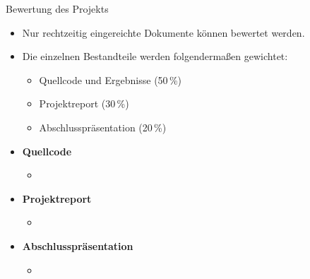 \begin{dwHeaderFrame}{Bewertung des Projekts}
	\begin{itemize}
		\item Nur rechtzeitig eingereichte Dokumente können bewertet werden.
		\item Die einzelnen Bestandteile werden folgendermaßen gewichtet:
		\begin{itemize}
			\item Quellcode und Ergebnisse (50\,\%)
			\item Projektreport (30\,\%)
			\item Abschlusspräsentation (20\,\%)
		\end{itemize}
	\end{itemize}

\end{dwHeaderFrame}


\begin{frame}
	\begin{itemize}
		\item \textbf{Quellcode}
		\begin{itemize}
			\item
		\end{itemize}
		\item \textbf{Projektreport}
		\begin{itemize}
			\item
		\end{itemize}
		\item \textbf{Abschlusspräsentation}
		\begin{itemize}
			\item
		\end{itemize}
	\end{itemize}
\end{frame}



